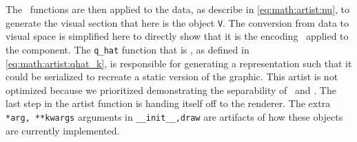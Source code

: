 \documentclass[../main.tex]{subfiles}
\begin{document}
 The \vchannel\ functions are then applied to the data, as describe in \autoref{eq:math:artist:nu}, to generate the visual section \vsection that here is the object \texttt{V}. The conversion from data to visual space is simplified here to directly show that it is the encoding \vchannel\ applied to the component. The \texttt{q_hat} function that is \vmarkd,  as defined in \autoref{eq:math:artist:qhat_k}, is responsible for generating a representation such that it could be serialized to recreate a static version of the graphic. This artist is not optimized because we prioritized demonstrating the separability of \vchannel\ and \vmarkd. The last step in the artist function is handing itself off to the renderer. The extra \texttt{*arg, **kwargs} arguments in \texttt{__init__,draw} are artifacts of how these objects are currently implemented.
\end{document}
